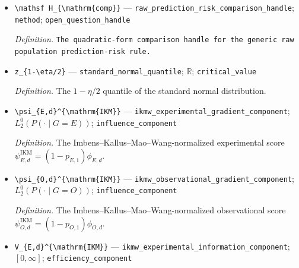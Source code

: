 \documentclass{article}
\begin{document}
\begin{itemize}
  \par\smallskip\noindent\emph{Definition.} \texttt{The witness design using two moderately informative proxies.}
  \item \texttt{\textbackslash{}\allowbreak{}mathsf H\_\allowbreak{}\{\textbackslash{}\allowbreak{}mathrm\{comp\}\allowbreak{}\}\allowbreak{}} --- \texttt{raw\_\allowbreak{}prediction\_\allowbreak{}risk\_\allowbreak{}comparison\_\allowbreak{}handle}; \texttt{method}; \texttt{open\_\allowbreak{}question\_\allowbreak{}handle}
  \par\smallskip\noindent\emph{Definition.} \texttt{The quadratic-\allowbreak{}form comparison handle for the generic raw population prediction-\allowbreak{}risk rule.}
  \item \texttt{z\_\allowbreak{}\{1-\allowbreak{}\textbackslash{}\allowbreak{}eta/\allowbreak{}2\}\allowbreak{}} --- \texttt{standard\_\allowbreak{}normal\_\allowbreak{}quantile}; \(\mathbb R\); \texttt{critical\_\allowbreak{}value}
  \par\smallskip\noindent\emph{Definition.} The \(1-\eta/2\) quantile of the standard normal distribution.
  \item \texttt{\textbackslash{}\allowbreak{}psi\_\allowbreak{}\{E,\allowbreak{}d\}\allowbreak{}\textasciicircum{}\{\textbackslash{}\allowbreak{}mathrm\{IKM\}\allowbreak{}\}\allowbreak{}} --- \texttt{ikmw\_\allowbreak{}experimental\_\allowbreak{}gradient\_\allowbreak{}component}; \(L_2^0(P(\cdot\mid G=E))\); \texttt{influence\_\allowbreak{}component}
  \par\smallskip\noindent\emph{Definition.} The Imbens--Kallus--Mao--Wang-normalized experimental score \(\psi_{E,d}^{\mathrm{IKM}}=(1-p_{E,1})\phi_{E,d}\).
  \item \texttt{\textbackslash{}\allowbreak{}psi\_\allowbreak{}\{O,\allowbreak{}d\}\allowbreak{}\textasciicircum{}\{\textbackslash{}\allowbreak{}mathrm\{IKM\}\allowbreak{}\}\allowbreak{}} --- \texttt{ikmw\_\allowbreak{}observational\_\allowbreak{}gradient\_\allowbreak{}component}; \(L_2^0(P(\cdot\mid G=O))\); \texttt{influence\_\allowbreak{}component}
  \par\smallskip\noindent\emph{Definition.} The Imbens--Kallus--Mao--Wang-normalized observational score \(\psi_{O,d}^{\mathrm{IKM}}=(1-p_{O,1})\phi_{O,d}\).
  \item \texttt{V\_\allowbreak{}\{E,\allowbreak{}d\}\allowbreak{}\textasciicircum{}\{\textbackslash{}\allowbreak{}mathrm\{IKM\}\allowbreak{}\}\allowbreak{}} --- \texttt{ikmw\_\allowbreak{}experimental\_\allowbreak{}information\_\allowbreak{}component}; \([0,\infty]\); \texttt{efficiency\_\allowbreak{}component}

\end{itemize}
\end{document}
